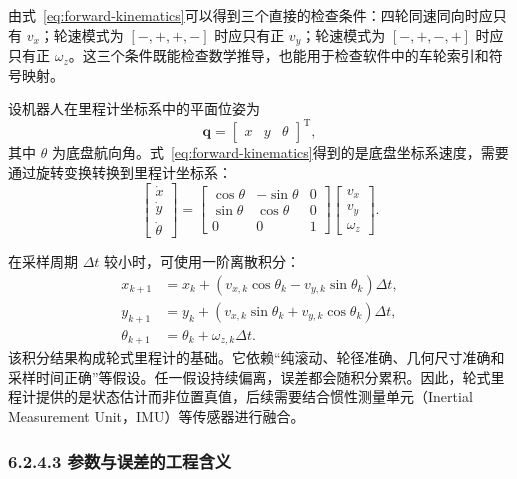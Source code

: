 \documentclass[UTF8,zihao=-4]{ctexart}
\newcommand{\vect}[1]{\bm{#1}}
\begin{document}
由式~\eqref{eq:forward-kinematics}可以得到三个直接的检查条件：四轮同速同向时应只有 $v_x$；轮速模式为 $[-,+,+,-]$ 时应只有正 $v_y$；轮速模式为 $[-,+,-,+]$ 时应只有正 $\omega_z$。这三个条件既能检查数学推导，也能用于检查软件中的车轮索引和符号映射。

设机器人在里程计坐标系中的平面位姿为
\begin{equation}
  \vect{q}=
  \begin{bmatrix}
    x & y & \theta
  \end{bmatrix}^{\mathrm T},
\end{equation}
其中 $\theta$ 为底盘航向角。式~\eqref{eq:forward-kinematics}得到的是底盘坐标系速度，需要通过旋转变换转换到里程计坐标系：
\begin{equation}
  \begin{bmatrix}
    \dot{x}\\
    \dot{y}\\
    \dot{\theta}
  \end{bmatrix}
  =
  \begin{bmatrix}
    \cos\theta & -\sin\theta & 0\\
    \sin\theta &  \cos\theta & 0\\
    0           &  0           & 1
  \end{bmatrix}
  \begin{bmatrix}
    v_x\\
    v_y\\
    \omega_z
  \end{bmatrix}.
  \label{eq:world-velocity}
\end{equation}

在采样周期 $\Delta t$ 较小时，可使用一阶离散积分：
\begin{align}
  x_{k+1} &= x_k + (v_{x,k}\cos\theta_k-v_{y,k}\sin\theta_k)\Delta t,\\
  y_{k+1} &= y_k + (v_{x,k}\sin\theta_k+v_{y,k}\cos\theta_k)\Delta t,\\
  \theta_{k+1} &= \theta_k + \omega_{z,k}\Delta t.
  \label{eq:odometry-integration}
\end{align}
该积分结果构成轮式里程计的基础。它依赖“纯滚动、轮径准确、几何尺寸准确和采样时间正确”等假设。任一假设持续偏离，误差都会随积分累积。因此，轮式里程计提供的是状态估计而非位置真值，后续需要结合惯性测量单元（Inertial Measurement Unit，IMU）等传感器进行融合。

\subsubsection*{6.2.4.3 参数与误差的工程含义}
\end{document}
